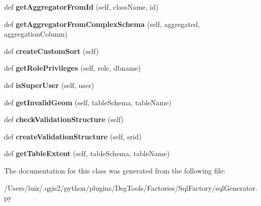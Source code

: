 \begin{DoxyCompactItemize}
def {\bfseries get\+Aggregator\+From\+Id} (self, class\+Name, id)
\item 
\mbox{\label{class_dsg_tools_1_1_factories_1_1_sql_factory_1_1sql_generator_1_1_sql_generator_af251e498253df081096afe0b47b24fd5}} 
def {\bfseries get\+Aggregator\+From\+Complex\+Schema} (self, aggregated, aggregation\+Column)
\item 
\mbox{\label{class_dsg_tools_1_1_factories_1_1_sql_factory_1_1sql_generator_1_1_sql_generator_aa85c369e28e8fd97bd4322bd31c271b2}} 
def {\bfseries create\+Custom\+Sort} (self)
\item 
\mbox{\label{class_dsg_tools_1_1_factories_1_1_sql_factory_1_1sql_generator_1_1_sql_generator_a98cb2cdce2ea1dfe5f5ea2fc46f818f3}} 
def {\bfseries get\+Role\+Privileges} (self, role, dbname)
\item 
\mbox{\label{class_dsg_tools_1_1_factories_1_1_sql_factory_1_1sql_generator_1_1_sql_generator_afba3f13f828529c97dd1d3ca51354022}} 
def {\bfseries is\+Super\+User} (self, user)
\item 
\mbox{\label{class_dsg_tools_1_1_factories_1_1_sql_factory_1_1sql_generator_1_1_sql_generator_ac2f6f3c946d71fc4249fa4381cf4294b}} 
def {\bfseries get\+Invalid\+Geom} (self, table\+Schema, table\+Name)
\item 
\mbox{\label{class_dsg_tools_1_1_factories_1_1_sql_factory_1_1sql_generator_1_1_sql_generator_a78713b7add2fe7595d1d44107ed6ca89}} 
def {\bfseries check\+Validation\+Structure} (self)
\item 
\mbox{\label{class_dsg_tools_1_1_factories_1_1_sql_factory_1_1sql_generator_1_1_sql_generator_a961cea1b3214848e71f6d8f6918f063c}} 
def {\bfseries create\+Validation\+Structure} (self, srid)
\item 
\mbox{\label{class_dsg_tools_1_1_factories_1_1_sql_factory_1_1sql_generator_1_1_sql_generator_a282870397f84841c1191cd21dda8b5bb}} 
def {\bfseries get\+Table\+Extent} (self, table\+Schema, table\+Name)
\end{DoxyCompactItemize}


The documentation for this class was generated from the following file\+:\begin{DoxyCompactItemize}
\item 
/\+Users/luiz/.\+qgis2/python/plugins/\+Dsg\+Tools/\+Factories/\+Sql\+Factory/sql\+Generator.\+py\end{DoxyCompactItemize}
